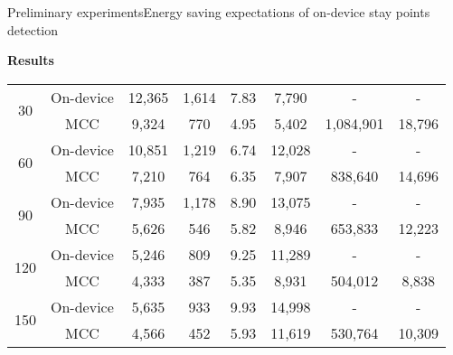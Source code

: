 \begin{frame}[noframenumbering]{Preliminary experiments}{Energy saving expectations of on-device stay points detection}
\begin{block}{\small \textbf{Results}}
{{\begin{tabular}{@{}cccccccc@{}}
\multirow{2}{*}{30}  & On-device   &  12,365 & 1,614 & 7.83  & 7,790 & - & - \\
                          & MCC &  9,324 &   770 & 4.95  & 5,402 & 1,084,901 & 18,796 \\
\cmidrule(l){2-8}
\multirow{2}{*}{60}  & On-device    & 10,851 & 1,219 & 6.74 & 12,028 & - & - \\
                          & MCC &  7,210 &   764 & 6.35 &  7,907 & 838,640 & 14,696 \\
\cmidrule(l){2-8}
\multirow{2}{*}{90}  & On-device    & 7,935 & 1,178 & 8.90 & 13,075 & - & - \\
                          & MCC & 5,626 &   546 & 5.82 &  8,946 & 653,833 & 12,223 \\
\cmidrule(l){2-8}
\multirow{2}{*}{120} & On-device    & 5,246 & 809 & 9.25 & 11,289 & - & - \\
                          & MCC & 4,333 & 387 & 5.35 &  8,931 & 504,012 & 8,838 \\
\cmidrule(l){2-8}
\multirow{2}{*}{150} & On-device    & 5,635 & 933 & 9.93 & 14,998 & - & - \\
                          & MCC & 4,566 & 452 & 5.93 & 11,619 & 530,764 & 10,309 \\
\bottomrule
\end{tabular}%
}
\par }
\end{block}
\end{frame}


